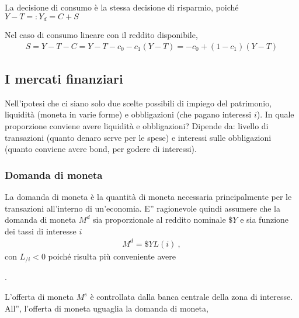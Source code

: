 \documentclass[letterpaper,10pt,italian]{jupyterBook}
\begin{document}
\sphinxAtStartPar
{} La decisione di consumo è la stessa decisione di risparmio, poiché \(Y - T =: Y_d = C + S\)

\sphinxAtStartPar
{} Nel caso di consumo lineare con il reddito disponibile,
\begin{equation*}
\begin{split}S = Y - T - C = Y - T - c_0 - c_1 (Y - T) = - c_0 + (1 - c_1)(Y-T)\end{split}
\end{equation*}

\subsection{I mercati finanziari}
\label{\detokenize{ch/macro:i-mercati-finanziari}}\label{\detokenize{ch/macro:economics-hs-macro-short-run-financial-market}}
\sphinxAtStartPar
Nell’ipotesi che ci siano solo due scelte possibili di impiego del patrimonio, liquidità (moneta in varie forme) e obbligazioni (che pagano interessi \(i\)). In quale proporzione conviene avere liquidità e obbligazioni? Dipende da: livello di transazioni (quanto denaro serve per le spese) e interessi sulle obbligazioni (quanto conviene avere bond, per godere di interessi).


\subsubsection{Domanda di moneta}
\label{\detokenize{ch/macro:domanda-di-moneta}}
\sphinxAtStartPar
La domanda di moneta è la quantità di moneta necessaria principalmente per le transazioni all’interno di un’economia. E” ragionevole quindi assumere che la domanda di moneta \(M^d\) sia proporzionale al reddito nominale \(\$Y\) e sia funzione dei tassi di interesse \(i\)
\begin{equation*}
\begin{split}M^d = \$ Y L(i) \ ,\end{split}
\end{equation*}
\sphinxAtStartPar
con \(L_{/i} < 0\) poiché risulta più conveniente avere

\sphinxAtStartPar
{} {\hyperref[\detokenize{ch/macro:economics-hs-macro-extra-expectations}]{}}.

\sphinxAtStartPar
L’offerta di moneta \(M^s\) è controllata dalla banca centrale della zona di interesse. All”, l’offerta di moneta uguaglia la domanda di moneta,
\end{document}
